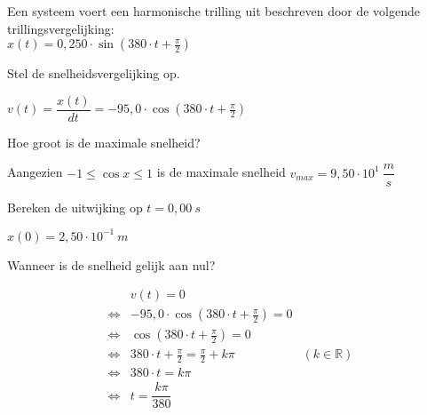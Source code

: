 \documentclass{ximera}
\begin{document}
\begin{exercise} 
    Een systeem voert een harmonische trilling uit beschreven door de volgende trillingsvergelijking:  \\
    $x(t)=0,250\cdot\sin(380\cdot t + \frac{\pi}{2})$
    
    \begin{question}
        Stel de snelheidsvergelijking op.
        \begin{oplossing}
            $v(t)=\dfrac{x(t)}{dt}=-95,0 \cdot\cos(380\cdot t + \frac{\pi}{2})$
        \end{oplossing}
    \end{question}

    \begin{question}
        Hoe groot is de maximale snelheid?
        \begin{oplossing}
            Aangezien $-1\leq\cos x\leq 1$ is de maximale snelheid $v_{max}=9,50 \cdot 10^{1} \ \dfrac{m}{s}$
        \end{oplossing}
    \end{question}

    \begin{question}
        Bereken de uitwijking op $t=0,00 \ s$
        \begin{oplossing}
            $x(0)=2,50\cdot 10^{-1} \ m$
        \end{oplossing}
    \end{question}

    \begin{question}
        Wanneer is de snelheid gelijk aan nul?
        \begin{oplossing}
            \begin{align*}
                &v(t)=0 \\
                \Leftrightarrow & -95,0 \cdot\cos(380\cdot t + \frac{\pi}{2})=0 \\
                \Leftrightarrow & \cos(380\cdot t + \frac{\pi}{2})=0 \\
                \Leftrightarrow & 380\cdot t + \frac{\pi}{2}=\frac{\pi}{2}+k\pi & (k \in \mathbb{R}) \\
                \Leftrightarrow & 380\cdot t =k\pi  \\
                \Leftrightarrow & t =\dfrac{k\pi}{380} 
            \end{align*}
        \end{oplossing}
    \end{question}
\end{exercise}
\end{document}
